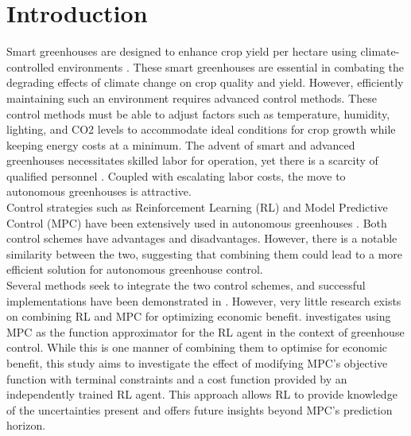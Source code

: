 \section{Introduction}
Smart greenhouses are designed to enhance crop yield per hectare using climate-controlled environments \cite{morcegoReinforcementLearningModel2023}. These smart greenhouses are essential in combating the degrading effects of climate change on crop quality and yield. However, efficiently maintaining such an environment requires advanced control methods. These control methods must be able to adjust factors such as temperature, humidity, lighting, and CO2 levels to accommodate ideal conditions for crop growth \cite{devopsGreenhouseClimateControl2021} while keeping energy costs at a minimum. The advent of smart and advanced greenhouses necessitates skilled labor for operation, yet there is a scarcity of qualified personnel \cite{rusnakWhatCurrentState2018}. Coupled with escalating labor costs, the move to autonomous greenhouses is attractive.\\
Control strategies such as Reinforcement Learning (RL) and Model Predictive Control (MPC) have been extensively used in autonomous greenhouses \cite{morcegoReinforcementLearningModel2023, boersmaRobustSamplebasedModel2022, lubbersAutonomousGreenhouseClimate2023, jansenOptimalControlLettuce2023}. Both control schemes have advantages and disadvantages. However, there is a notable similarity between the two, suggesting that combining them could lead to a more efficient solution for autonomous greenhouse control.\\
Several methods seek to integrate the two control schemes, and successful implementations have been demonstrated in \cite{lubbersAutonomousGreenhouseClimate2023, arroyoReinforcedModelPredictive2022, linReinforcementLearningBasedModel2023}. However, very little research exists on combining RL and MPC for optimizing economic benefit. \citet{lubbersAutonomousGreenhouseClimate2023} investigates using MPC as the function approximator for the RL agent in the context of greenhouse control. While this is one manner of combining them to optimise for economic benefit, this study aims to investigate the effect of modifying MPC's objective function with terminal constraints and a cost function provided by an independently trained RL agent. This approach allows RL to provide knowledge of the uncertainties present and offers future insights beyond MPC's prediction horizon.

